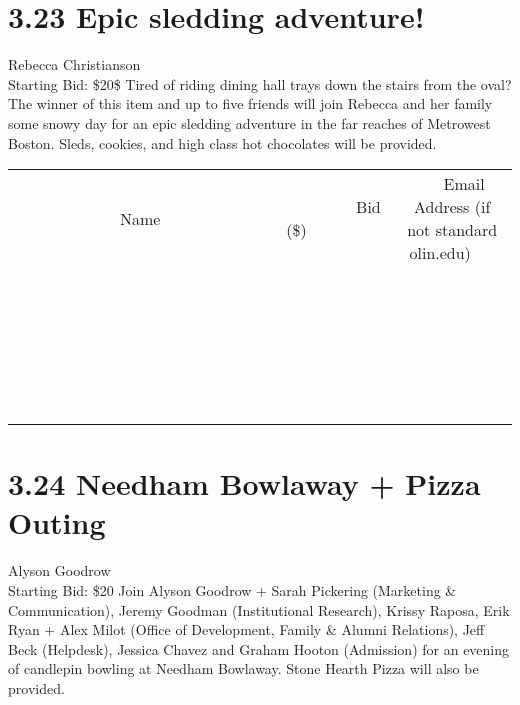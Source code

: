 \documentclass[11pt]{article}
\begin{document}
\section*{3.23 Epic sledding adventure!}
Rebecca Christianson
\\
Starting Bid: \$20\$
\newline
Tired of riding dining hall trays down the stairs from the oval?  The winner of this item and up to five friends will join Rebecca and her family some snowy day for an epic sledding adventure in the far reaches of Metrowest Boston.  Sleds, cookies, and high class hot chocolates will be provided.
\\[6ex]
\begin{tabular}{c c c}
~~~~~~~~~~~~~Name~~~~~~~~~~~~~ & ~~~~~~~~~Bid (\$)~~~~~~~~~  & ~~~Email Address (if not standard olin.edu)~~~\\
 & & \\
\hline
 & & \\
\hline
 & & \\
\hline
 & & \\
\hline
 & & \\
\hline
 & & \\
\hline
 & & \\
\hline
 & & \\
\hline
 & & \\
\hline
 & & \\
\hline
 & & \\
\hline
 & & \\
\hline
 & & \\
\hline
 & & \\
\hline
 & & \\
\hline
 & & \\
\hline
 & & \\
\hline
 & & \\
\hline
 & & \\
\hline
 & & \\
\hline
 & & \\
\hline
 & & \\
\hline
 & & \\
\hline
 & & \\
\hline
 & & \\
\hline
 & & \\
\hline
\end{tabular}
\newpage
\section*{3.24 Needham Bowlaway + Pizza Outing}
Alyson Goodrow
\\
Starting Bid: \$20
\newline
Join Alyson Goodrow + Sarah Pickering (Marketing \& Communication), Jeremy Goodman (Institutional Research), Krissy Raposa, Erik Ryan + Alex Milot (Office of Development, Family \& Alumni Relations), Jeff Beck (Helpdesk), Jessica Chavez and Graham Hooton (Admission) for an evening of candlepin bowling at Needham Bowlaway. Stone Hearth Pizza will also be provided.
\end{document}
